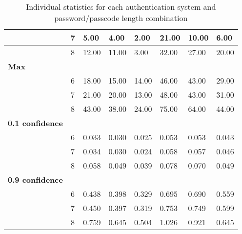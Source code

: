 \documentclass[british,10pt,a4paper]{article}
\begin{document}
\begin{appendices}
\begin{table}[]
\begin{tabular}{|l|l|l|l|l|l|l|l|}
		 & 7 & 5.00 & 4.00 & 2.00 & 21.00 & 10.00 & 6.00 \\ \hline
		 & 8 & 12.00 & 11.00 & 3.00 & 32.00 & 27.00 & 20.00 \\ \hline
		\textbf{Max} &  &  &  &  &  &  &  \\ \hline
		 & 6 & 18.00 & 15.00 & 14.00 & 46.00 & 43.00 & 29.00 \\ \hline
		 & 7 & 21.00 & 20.00 & 13.00 & 48.00 & 43.00 & 31.00 \\ \hline
		 & 8 & 43.00 & 38.00 & 24.00 & 75.00 & 64.00 & 44.00 \\ \hline
		\textbf{0.1 confidence} &  &  &  &  &  &  &  \\ \hline
		 & 6 & 0.033 & 0.030 & 0.025 & 0.053 & 0.053 & 0.043 \\ \hline
		 & 7 & 0.034 & 0.030 & 0.024 & 0.058 & 0.057 & 0.046 \\ \hline
		 & 8 & 0.058 & 0.049 & 0.039 & 0.078 & 0.070 & 0.049 \\ \hline
		\textbf{0.9 confidence} &  &  &  &  &  &  &  \\ \hline
		 & 6 & 0.438 & 0.398 & 0.329 & 0.695 & 0.690 & 0.559 \\ \hline
		 & 7 & 0.450 & 0.397 & 0.319 & 0.753 & 0.749 & 0.599 \\ \hline
		 & 8 & 0.759 & 0.645 & 0.504 & 1.026 & 0.921 & 0.645 \\ \hline
		\end{tabular}
		\caption{Individual statistics for each authentication system and password/passcode length combination}
	\end{table}
  	\clearpage


\end{appendices}
\end{document}
